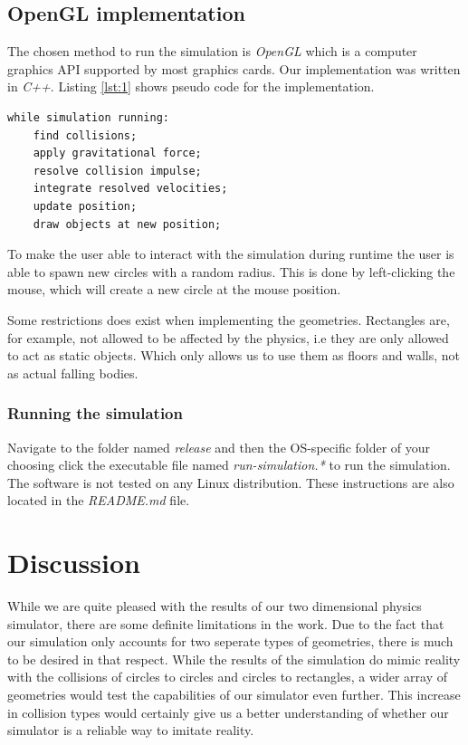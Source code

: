 \documentclass[a4paper,12pt]{report}
\begin{document}
\section{OpenGL implementation}
\label{sec:opengl}

The chosen method to run the simulation is \emph{OpenGL} which is a computer graphics API supported by most graphics cards. Our implementation was written in \emph{C++}. Listing \ref{lst:1} shows pseudo code for the implementation.

\begin{lstlisting}[caption={Pseudo code for the simulation loop.}, label=lst:1]
while simulation running:
    find collisions;
    apply gravitational force;
    resolve collision impulse;
    integrate resolved velocities;
    update position;
    draw objects at new position;
\end{lstlisting}

To make the user able to interact with the simulation during runtime the user is able to spawn new circles with a random radius. This is done by left-clicking the mouse, which will create a new circle at the mouse position.

Some restrictions does exist when implementing the geometries. Rectangles are, for example, not allowed to be affected by the physics, i.e they are only allowed to act as static objects. Which only allows us to use them as floors and walls, not as actual falling bodies.

\subsection{Running the simulation}

Navigate to the folder named \emph{release} and then the OS-specific folder of your choosing click the executable file named \emph{run-simulation.*} to run the simulation. The software is not tested on any Linux distribution. These instructions are also located in the \emph{README.md} file.


\chapter{Discussion}

While we are quite pleased with the results of our two dimensional physics simulator, there are some definite limitations in the work. Due to the fact that our simulation only accounts for two seperate types of geometries, there is much to be desired in that respect. While the results of the simulation do mimic reality with the collisions of circles to circles and circles to rectangles, a wider array of geometries would test the capabilities of our simulator even further. This increase in collision types would certainly give us a better understanding of whether our simulator is a reliable way to imitate reality.
\end{document}
